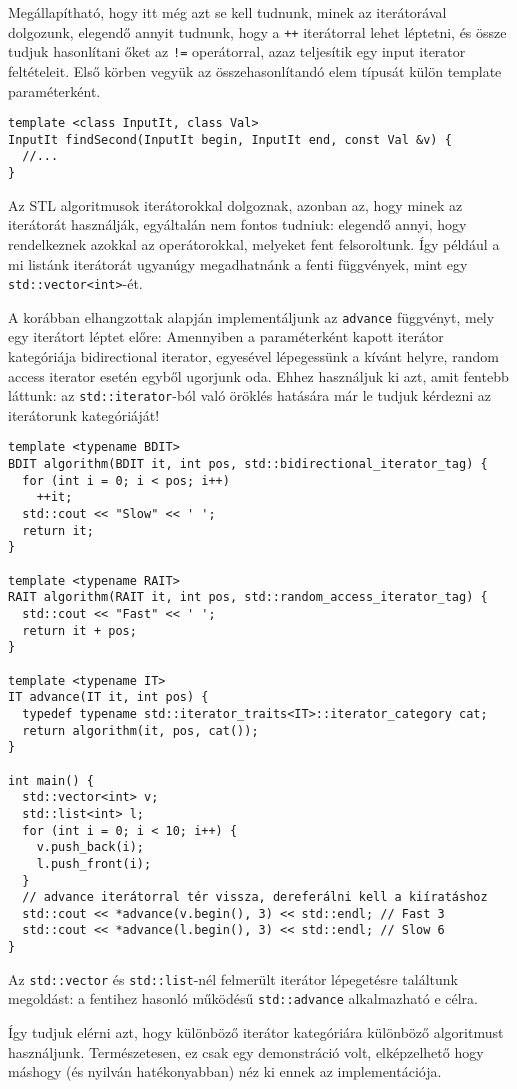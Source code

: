 \documentclass[../cpp_book/cpp_book.tex]{subfiles}
\begin{document}
	\smallskip
	Megállapítható, hogy itt még azt se kell tudnunk, minek az iterátorával dolgozunk, elegendő annyit tudnunk, hogy a \texttt{++} iterátorral lehet léptetni, és össze tudjuk hasonlítani őket az \texttt{!=} operátorral, azaz teljesítik egy input iterator feltételeit. Első körben vegyük az összehasonlítandó elem típusát külön template paraméterként.
	\begin{lstlisting}
template <class InputIt, class Val>
InputIt findSecond(InputIt begin, InputIt end, const Val &v) {
  //...
}
	\end{lstlisting}
	
	Az STL algoritmusok iterátorokkal dolgoznak, azonban az, hogy minek az iterátorát használják, egyáltalán nem fontos tudniuk: elegendő annyi, hogy rendelkeznek azokkal az operátorokkal, melyeket fent felsoroltunk. Így például a mi listánk iterátorát ugyanúgy megadhatnánk a fenti függvények, mint egy \texttt{std::vector<int>}-ét.
	
	\medskip
	A korábban elhangzottak alapján implementáljunk az \texttt{advance} függvényt, mely egy iterátort léptet előre: Amennyiben a paraméterként kapott iterátor kategóriája bidirectional iterator, egyesével lépegessünk a kívánt helyre, random access iterator esetén egyből ugorjunk oda.  Ehhez használjuk ki azt, amit fentebb láttunk: az \texttt{std::iterator}-ból való öröklés hatására már le tudjuk kérdezni az iterátorunk kategóriáját!
	\begin{lstlisting}
template <typename BDIT>
BDIT algorithm(BDIT it, int pos, std::bidirectional_iterator_tag) {
  for (int i = 0; i < pos; i++)
    ++it;
  std::cout << "Slow" << ' ';
  return it;
}

template <typename RAIT>
RAIT algorithm(RAIT it, int pos, std::random_access_iterator_tag) {
  std::cout << "Fast" << ' ';
  return it + pos;
}

template <typename IT>
IT advance(IT it, int pos) {
  typedef typename std::iterator_traits<IT>::iterator_category cat;
  return algorithm(it, pos, cat());
}

int main() {
  std::vector<int> v;
  std::list<int> l;
  for (int i = 0; i < 10; i++) {
    v.push_back(i);
    l.push_front(i);
  }
  // advance iterátorral tér vissza, dereferálni kell a kiíratáshoz
  std::cout << *advance(v.begin(), 3) << std::endl; // Fast 3
  std::cout << *advance(l.begin(), 3) << std::endl; // Slow 6
}
	\end{lstlisting}
	\begin{note}
		Az \texttt{std::vector} és \texttt{std::list}-nél felmerült iterátor lépegetésre találtunk megoldást: a fentihez hasonló működésű \texttt{std::advance} alkalmazható e célra.
	\end{note}
	Így tudjuk elérni azt, hogy különböző iterátor kategóriára különböző algoritmust használjunk. Természetesen, ez csak egy demonstráció volt, elképzelhető hogy máshogy (és nyilván hatékonyabban) néz ki ennek az implementációja.
	\medskip
	
\end{document}
